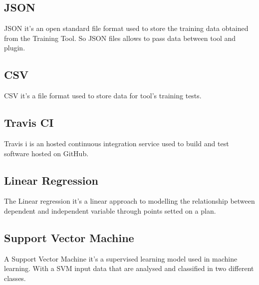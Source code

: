 \subsection{JSON}
JSON it's an open standard file format used to store the training data obtained from the Training Tool. So JSON files allows to pass data between tool and plugin.

\subsection{CSV}
CSV it's a file format used to store data for tool's training tests.

\subsection{Travis CI}
Travis i is an hosted continuous integration service used to build and test software hosted on GitHub.

\subsection{Linear Regression}
The Linear regression it's a linear approach to modelling the relationship between dependent and independent variable through points setted on a plan.

\subsection{Support Vector Machine}
A Support Vector Machine it's a supervised learning model used in machine learning. With a SVM input data that are analysed  and classified in two different classes.
 